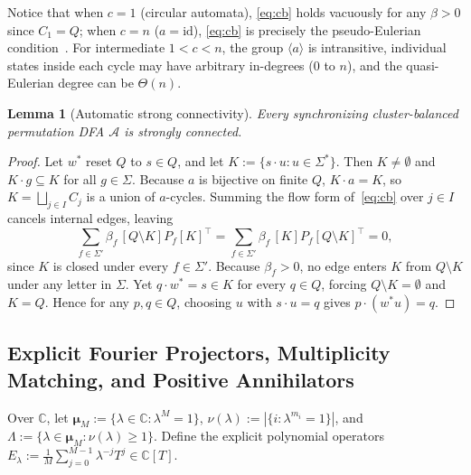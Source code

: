 \documentclass[11pt,a4paper]{article}
\newtheorem{lemma}[theorem]{Lemma}
\theoremstyle{definition}
\theoremstyle{remark}
\newcommand{\id}{\mathrm{id}}
\newcommand{\C}{\mathbb{C}}
\newcommand{\cA}{\mathcal{A}}
\newcommand{\bmu}{\boldsymbol{\mu}}
\newcommand{\ind}[1]{[#1]}
\begin{document}
Notice that when $c = 1$ (circular automata), \eqref{eq:cb} holds vacuously for any $\beta > 0$ since $C_1 = Q$; when $c = n$ ($a = \id$), \eqref{eq:cb} is precisely the pseudo-Eulerian condition~\cite{Kari2003,Steinberg2011}. For intermediate $1 < c < n$, the group $\langle a \rangle$ is intransitive, individual states inside each cycle may have arbitrary in-degrees ($0$ to $n$), and the quasi-Eulerian degree can be $\Theta(n)$.

\begin{lemma}[Automatic strong connectivity]
\label{lem:cb-sc}
Every synchronizing cluster-balanced permutation DFA $\cA$ is strongly connected.
\end{lemma}
\begin{proof}
Let $w^*$ reset $Q$ to $s \in Q$, and let $K := \{s \cdot u : u \in \Sigma^*\}$. Then $K \neq \emptyset$ and $K \cdot g \subseteq K$ for all $g \in \Sigma$. Because $a$ is bijective on finite $Q$, $K \cdot a = K$, so $K = \bigsqcup_{j \in I} C_j$ is a union of $a$-cycles. Summing the flow form of~\eqref{eq:cb} over $j \in I$ cancels internal edges, leaving
\[
  \sum_{f \in \Sigma'} \beta_f \, \ind{Q \setminus K} P_f \ind{K}^\top = \sum_{f \in \Sigma'} \beta_f \, \ind{K} P_f \ind{Q \setminus K}^\top = 0,
\]
since $K$ is closed under every $f \in \Sigma'$. Because $\beta_f > 0$, no edge enters $K$ from $Q \setminus K$ under any letter in $\Sigma$. Yet $q \cdot w^* = s \in K$ for every $q \in Q$, forcing $Q \setminus K = \emptyset$ and $K = Q$. Hence for any $p, q \in Q$, choosing $u$ with $s \cdot u = q$ gives $p \cdot (w^* u) = q$.
\end{proof}

\subsection{Explicit Fourier Projectors, Multiplicity Matching, and Positive Annihilators}

Over $\C$, let $\bmu_M := \{\lambda \in \C : \lambda^M = 1\}$, $\nu(\lambda) := |\{i : \lambda^{m_i} = 1\}|$, and $\Lambda := \{\lambda \in \bmu_M : \nu(\lambda) \ge 1\}$. Define the explicit polynomial operators $E_\lambda := \frac{1}{M}\sum_{j=0}^{M-1} \lambda^{-j} T^j \in \C[T]$.
\end{document}
